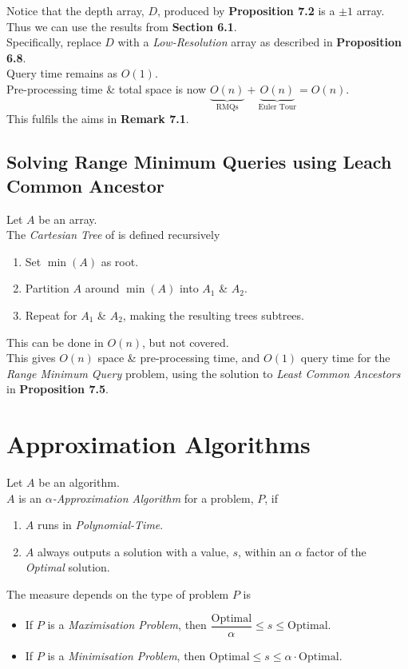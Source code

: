 \documentclass[11pt,a4paper]{article}
\begin{document}
Notice that the depth array, $D$, produced by \textbf{Proposition 7.2} is a $\pm1$ array.\\
Thus we can use the results from \textbf{Section 6.1}.\\
Specifically, replace $D$ with a \textit{Low-Resolution} array as described in \textbf{Proposition 6.8}.\\
Query time remains as $O(1)$.\\
Pre-processing time \& total space is now $\underbrace{O(n)}_\text{RMQs}+\underbrace{O(n)}_\text{Euler Tour}=O(n)$.\\
This fulfils the aims in \textbf{Remark 7.1}.

\subsection{Solving Range Minimum Queries using Leach Common Ancestor}

Let $A$ be an array.\\
The \textit{Cartesian Tree} of is defined recursively
\begin{enumerate}
	\item Set $\min(A)$ as root.
	\item Partition $A$ around $\min(A)$ into $A_1$ \& $A_2$.
	\item Repeat for $A_1$ \& $A_2$, making the resulting trees subtrees.
\end{enumerate}
\nb This can be done in $O(n)$, but not covered.\\

This gives $O(n)$ space \& pre-processing time, and $O(1)$ query time for the \textit{Range Minimum Query} problem, using the solution to \textit{Least Common Ancestors} in \textbf{Proposition 7.5}.

\section{Approximation Algorithms}


Let $A$ be an algorithm.\\
$A$ is an \textit{$\alpha$-Approximation Algorithm} for a problem, $P$, if
\begin{enumerate}
	\item $A$ runs in \textit{Polynomial-Time}.
	\item $A$ always outputs a solution with a value, $s$, within an $\alpha$ factor of the \textit{Optimal} solution.
\end{enumerate}
The measure depends on the type of problem $P$ is
\begin{itemize}
	\item If $P$ is a \textit{Maximisation Problem}, then $\dfrac{\text{Optimal}}\alpha\leq s\leq\text{Optimal}$.
	\item If $P$ is a \textit{Minimisation Problem}, then $\text{Optimal}\leq s\leq\alpha\cdot\text{Optimal}$.
\end{itemize}
\end{document}
